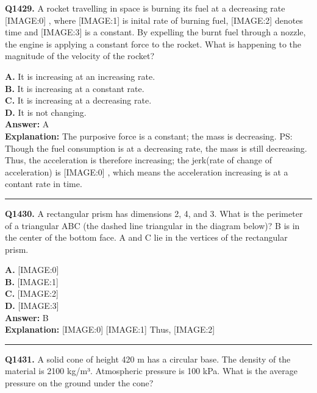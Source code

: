 \documentclass[12pt]{article}
\begin{document}
\noindent
\textbf{Q1429.} A rocket travelling in space is burning its fuel at a decreasing rate
[IMAGE:0]
, where
[IMAGE:1]
is inital rate of burning fuel,
[IMAGE:2]
denotes time and
[IMAGE:3]
is a constant. By expelling the burnt fuel through a nozzle, the engine is applying a constant force to the rocket.
What is happening to the magnitude of the velocity of the rocket?



\textbf{A.} It is increasing at an increasing rate. \\
\textbf{B.} It is increasing at a constant rate. \\
\textbf{C.} It is increasing at a decreasing rate. \\
\textbf{D.} It is not changing. \\

\textbf{Answer:} A \\
\textbf{Explanation:} The purposive force is a constant; the mass is decreasing.
PS: Though the fuel consumption is at a decreasing rate, the mass is still decreasing.
Thus, the acceleration is therefore increasing;
the jerk(rate of change of acceleration) is
[IMAGE:0]
, which means the acceleration increasing is at a contant rate in time.

\hrule
\vspace{1em}


\noindent
\textbf{Q1430.} A rectangular prism has dimensions 2, 4, and 3. What is the perimeter of a triangular ABC (the dashed line triangular in the diagram below)? B is in the center of the bottom face. A and C lie in the vertices of the rectangular prism.



\textbf{A.} [IMAGE:0] \\
\textbf{B.} [IMAGE:1] \\
\textbf{C.} [IMAGE:2] \\
\textbf{D.} [IMAGE:3] \\

\textbf{Answer:} B \\
\textbf{Explanation:} [IMAGE:0]
[IMAGE:1]
Thus,
[IMAGE:2]

\hrule
\vspace{1em}


\noindent
\textbf{Q1431.} A solid cone of height 420 m has a circular base. The density of the material is 2100 kg/m³. Atmospheric pressure is 100 kPa. What is the average pressure on the ground under the cone?
\end{document}
